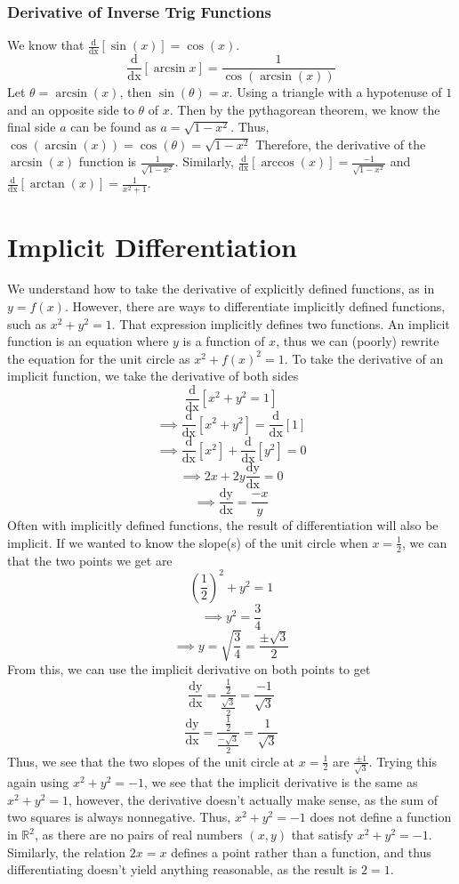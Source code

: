 \documentclass[oneside]{book}
\newcommand\tab[1][1cm]{\hspace*{#1}}
\newcommand\nextline{\newline\tab}
\newcommand\ddx[1]{\frac{\text{d}}{\text{dx}}\left[#1\right]}
\newcommand\dydx{\frac{\text{dy}}{\text{dx}}}
\begin{document}
\subsection{Derivative of Inverse Trig Functions}
\tab
We know that $\ddx{\sin(x)} = \cos(x)$. 
$$\ddx{\arcsin{x}}=\frac{1}{\cos(\arcsin(x))}$$
Let $\theta=\arcsin(x)$, then $\sin(\theta)=x$. Using a triangle with a hypotenuse of $1$ and an opposite side to $\theta$ of $x$. Then by the pythagorean theorem, we know the final side $a$ can be found as $a=\sqrt{1-x^2}$. Thus, $\cos(\arcsin(x)) = \cos(\theta) = \sqrt{1-x^2}$
\nextline
Therefore, the derivative of the $\arcsin(x)$ function is $\frac{1}{\sqrt{1-x^2}}$. Similarly, $\ddx{\arccos(x)} = \frac{-1}{\sqrt{1-x^2}}$ and $\ddx{\arctan(x)}=\frac{1}{x^2+1}$.
\chapter{Implicit Differentiation}
\tab
We understand how to take the derivative of explicitly defined functions, as in $y=f(x)$. However, there are ways to differentiate implicitly defined functions, such as $x^2+y^2=1$. That expression implicitly defines two functions. An implicit function is an equation where $y$ is a function of $x$, thus we can (poorly) rewrite the equation for the unit circle as $x^2+f(x)^2 = 1$.
\nextline
To take the derivative of an implicit function, we take the derivative of both sides
$$\ddx{x^2+y^2=1}$$
$$\implies \ddx{x^2+y^2} = \ddx{1}$$
$$\implies \ddx{x^2}+\ddx{y^2} = 0$$
$$\implies 2x + 2y\dydx = 0$$
$$\implies \dydx=\frac{-x}{y}$$
\tab
Often with implicitly defined functions, the result of differentiation will also be implicit.
\nextline
If we wanted to know the slope(s) of the unit circle when $x=\frac{1}{2}$, we can that the two points we get are
$$\left(\frac{1}{2}\right)^2 + y^2 = 1$$
$$\implies y^2 = \frac{3}{4}$$
$$\implies y=\sqrt{\frac{3}{4}}=\frac{\pm\sqrt{3}}{2}$$
\tab
From this, we can use the implicit derivative on both points to get
$$\dydx=\frac{\frac{1}{2}}{\frac{\sqrt{3}}{2}} = \frac{-1}{\sqrt{3}}$$
$$\dydx=\frac{\frac{1}{2}}{\frac{-\sqrt{3}}{2}} = \frac{1}{\sqrt{3}}$$
\tab
Thus, we see that the two slopes of the unit circle at $x=\frac{1}{2}$ are $\frac{\pm1}{\sqrt{3}}$.
\nextline
Trying this again using $x^2+y^2=-1$, we see that the implicit derivative is the same as $x^2+y^2=1$, however, the derivative doesn't actually make sense, as the sum of two squares is always nonnegative. Thus, $x^2+y^2=-1$ does not define a function in $\mathbb{R}^2$, as there are no pairs of real numbers $(x,y)$ that satisfy $x^2+y^2=-1$.
\nextline
Similarly, the relation $2x=x$ defines a point rather than a function, and thus differentiating doesn't yield anything reasonable, as the result is $2=1$. 
\end{document}
